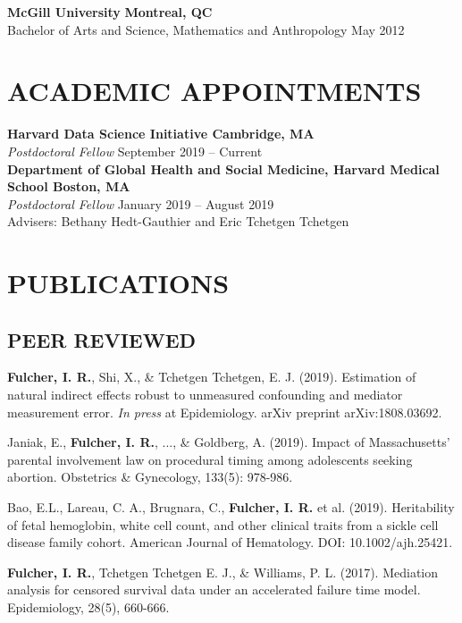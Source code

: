 \documentclass[12pt]{article}
\begin{document}
\textbf{McGill University} \hfill \hfill \textbf{Montreal, QC} \\
Bachelor of Arts and Science, Mathematics and Anthropology  \hfill \hfill May 2012 


\section*{\textbf{{\large A}CADEMIC {\large A}PPOINTMENTS }}

\textbf{Harvard Data Science Initiative \hfill \hfill Cambridge, MA} \\
\textit{Postdoctoral Fellow}  \hfill \hfill September 2019 -- Current \\

\textbf{Department of Global Health and Social Medicine, Harvard Medical School \hfill \hfill Boston, MA} \\
\textit{Postdoctoral Fellow} \hfill \hfill January 2019 -- August 2019 \\
Advisers: Bethany Hedt-Gauthier and Eric Tchetgen Tchetgen 

\section*{\textbf{{\large P}{UBLICATIONS}}}

\subsection*{\textbf{PEER REVIEWED}}

\begin{etaremune}
	\item \textbf{Fulcher, I. R.}, Shi, X., \& Tchetgen Tchetgen, E. J. (2019). Estimation of natural indirect effects robust to unmeasured confounding and mediator measurement error. \textit{In press} at Epidemiology. arXiv preprint arXiv:1808.03692.  
	
	\item Janiak, E., \textbf{Fulcher, I. R.}, ..., \& Goldberg, A. (2019). Impact of Massachusetts' parental involvement law on procedural timing among adolescents seeking abortion. Obstetrics \& Gynecology, 133(5): 978-986.
	
	\item Bao, E.L., Lareau, C. A., Brugnara, C., \textbf{Fulcher, I. R.} et al. (2019). Heritability of fetal hemoglobin, white cell count, and other clinical traits from a sickle cell disease family cohort. American Journal of Hematology. DOI: 10.1002/ajh.25421. 
	
	\item \textbf{Fulcher, I. R.}, Tchetgen Tchetgen E. J., \& Williams, P. L. (2017). Mediation analysis for censored survival data under an accelerated failure time model.  Epidemiology, 28(5), 660-666. 
	
\end{etaremune}
\end{document}

